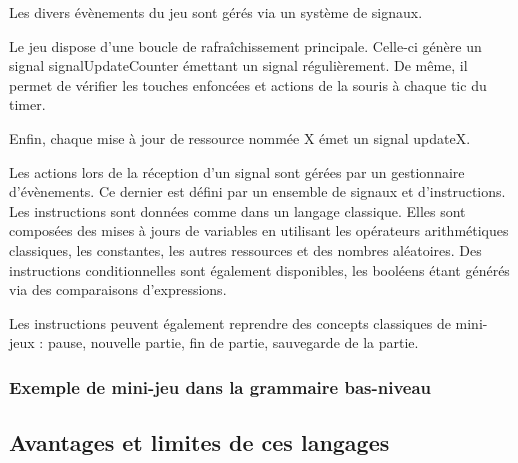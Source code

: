 Les divers évènements du jeu sont gérés via un système de signaux.

Le jeu dispose d'une boucle de rafraîchissement principale. Celle-ci génère un signal
signalUpdateCounter émettant un signal régulièrement.
De même, il permet de vérifier les touches enfoncées et actions de la souris à chaque tic du timer.

Enfin, chaque mise à jour de ressource nommée X émet un signal updateX.

Les actions lors de la réception d'un signal sont gérées par un gestionnaire d'évènements.
Ce dernier est défini par un ensemble de signaux et d'instructions.
Les instructions sont données comme dans un langage classique.
Elles sont composées des mises à jours de variables en utilisant les opérateurs arithmétiques classiques, les constantes, les autres ressources et des nombres
aléatoires.
Des instructions conditionnelles sont également disponibles, les booléens étant générés via des comparaisons d'expressions.

Les instructions peuvent également reprendre des concepts classiques de mini-jeux : pause, nouvelle partie, fin de partie, sauvegarde de la partie.

\subsubsection{Exemple de mini-jeu dans la grammaire bas-niveau}


\subsection{Avantages et limites de ces langages}

